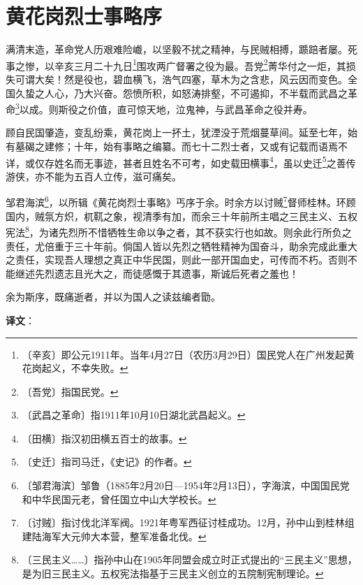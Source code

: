 \documentclass[12pt,UTF-8,openany]{ctexbook}
\begin{document}
\chapter{黄花岗烈士事略序}

\begin{normalsize}
    
    满清末造，革命党人历艰难险巇，以坚毅不扰之精神，与民贼相搏，踬踣者屡。死事之惨，以辛亥三月二十九日\footnote{〔辛亥〕即公元1911年。当年4月27日（农历3月29日）国民党人在广州发起黄花岗起义，不幸失败。}围攻两广督署之役为最。吾党\footnote{〔吾党〕指国民党。}菁华付之一炬，其损失可谓大矣！然是役也，碧血横飞，浩气四塞，草木为之含悲，风云因而变色。全国久蛰之人心，乃大兴奋。怨愤所积，如怒涛排壑，不可遏抑，不半载而武昌之革命\footnote{〔武昌之革命〕指1911年10月10日湖北武昌起义。}以成。则斯役之价值，直可惊天地，泣鬼神，与武昌革命之役并寿。
    
    顾自民国肇造，变乱纷乘，黄花岗上一抔土，犹湮没于荒烟蔓草间。延至七年，始有墓碣之建修；十年，始有事略之编纂。而七十二烈士者，又或有记载而语焉不详，或仅存姓名而无事迹，甚者且姓名不可考，如史载田横事\footnote{〔田横〕指汉初田横五百士的故事。}，虽以史迁\footnote{〔史迁〕指司马迁，《史记》的作者。}之善传游侠，亦不能为五百人立传，滋可痛矣。
    
    邹君海滨\footnote{〔邹君海滨〕邹鲁（1885年2月20日—1954年2月13日），字海滨，中国国民党和中华民国元老，曾任国立中山大学校长。}，以所辑《黄花岗烈士事略》丐序于余。时余方以讨贼\footnote{〔讨贼〕指讨伐北洋军阀。1921年粤军西征讨桂成功。12月，孙中山到桂林组建陆海军大元帅大本营，整军准备北伐。}督师桂林。环顾国内，贼氛方炽，杌靰之象，视清季有加，而余三十年前所主唱之三民主义、五权宪法\footnote{〔三民主义……〕指孙中山在1905年同盟会成立时正式提出的“三民主义”思想，是为旧三民主义。五权宪法指基于三民主义创立的五院制宪制理论。}，为诸先烈所不惜牺牲生命以争之者，其不获实行也如故。则余此行所负之责任，尤倍重于三十年前。倘国人皆以先烈之牺牲精神为国奋斗，助余完成此重大之责任，实现吾人理想之真正中华民国，则此一部开国血史，可传而不朽。否则不能继述先烈遗志且光大之，而徒感慨于其遗事，斯诚后死者之羞也！
    
    余为斯序，既痛逝者，并以为国人之读兹编者勖。
\end{normalsize}


\newpage

\textbf{译文}：

\vspace{1em}
\end{document}
